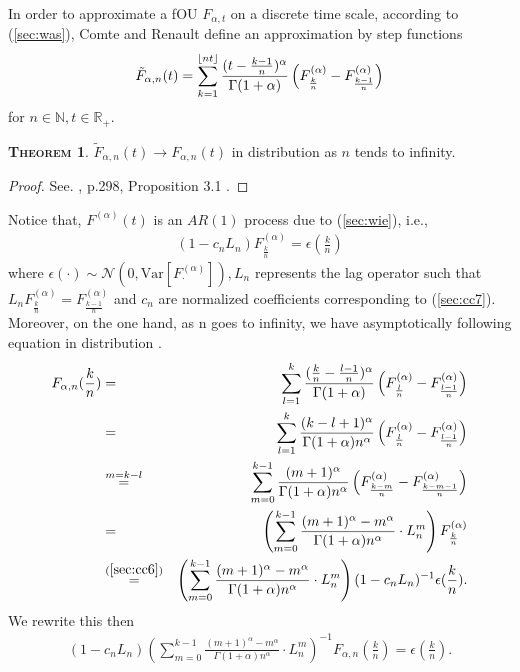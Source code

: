 \documentclass[a4paper, twoside, 11pt]{article}
\theoremstyle{definition}
\newtheorem{theorem}[definition]{\scshape Theorem}
\DeclarePairedDelimiter\floor{\lfloor}{\rfloor}
\newcommand{\brkt}[1]{\left({#1} \right)}
\begin{document}
In order to approximate a fOU $ F_{\alpha,t}$ on a discrete time scale, according to (\ref{sec:was}), Comte and Renault define an approximation by step functions
\begin{eqnarray}
 \tilde{F}_{\alpha,n}(t) = \sum_{k=1}^{\floor{nt}} \frac{(t - \frac{k-1}{n})^\alpha}{\Gamma(1+\alpha)} \brkt{F^{(\alpha)}_{\frac{k}{n}} - F^{(\alpha)}_{\frac{k-1}{n}}}
  \label{sec:cc7}
\end{eqnarray}
for $n\in \mathbb{N}, t\in\mathbb{R}_+$.
\begin{theorem}
  $\tilde{F}_{\alpha,n}(t)\rightarrow F_{\alpha,n}(t)$ in distribution as $n$ tends to infinity.  
  \label{sec:cont}
\end{theorem}
\begin{proof}
  See. \cite{comren}, p.298, Proposition 3.1 .
\end{proof}
Notice that, $F^{(\alpha)}(t)$ is an $AR(1)$ process due to (\ref{sec:wie}), i.e.,
\begin{eqnarray}
  (1-c_nL_n) {F}^{(\alpha)}_{\frac{k}{n}} = \epsilon(\frac{k}{n})
  \label{sec:cc6}
\end{eqnarray}
where $\epsilon(\cdot) \sim \mathcal{N}(0, \mathrm{Var}[F^{(\alpha)}_{\cdot}]), L_n $ represents the lag operator such that $L_n F^{(\alpha)}_{\frac{k}{n}} = F^{(\alpha)}_{\frac{k-1}{n}}$  and $c_n$ are normalized coefficients corresponding to (\ref{sec:cc7}). Moreover, on the one hand, as n goes to infinity, we have asymptotically following equation in distribution .
\begin{eqnarray}
  F_{\alpha,n}(\frac{k}{n}) &=& \sum_{l=1}^{k} \frac{(\frac{k}{n} - \frac{l-1}{n})^\alpha}{\Gamma(1+\alpha)} \brkt{F^{(\alpha)}_{\frac{l}{n}} - F^{(\alpha)}_{\frac{l-1}{n}}}\nonumber\\
  &=& \sum_{l=1}^{k} \frac{(k - l + 1)^\alpha}{\Gamma(1+\alpha)n^\alpha} \brkt{F^{(\alpha)}_{\frac{l}{n}} - F^{(\alpha)}_{\frac{l-1}{n}}}\nonumber\\
  &\overset{m=k-l}{=}& \sum_{m=0}^{k-1} \frac{(m + 1)^\alpha}{\Gamma(1+\alpha)n^\alpha} \brkt{F^{(\alpha)}_{\frac{k-m}{n}} - F^{(\alpha)}_{\frac{k-m-1}{n}}}\nonumber\\ 
  &=& \brkt{\sum_{m=0}^{k-1} \frac{(m + 1)^\alpha - m^\alpha}{\Gamma(1+\alpha)n^\alpha} \cdot L_n^m} F^{(\alpha)}_{\frac{k}{n}} \nonumber\\
  &\overset{(\ref{sec:cc6})}{=}&  \brkt{\sum_{m=0}^{k-1} \frac{(m + 1)^\alpha - m^\alpha}{\Gamma(1+\alpha)n^\alpha} \cdot L_n^m} (1-c_nL_n)^{-1}\epsilon(\frac{k}{n}).
\end{eqnarray}
We rewrite this then
\begin{eqnarray*}
  (1-c_nL_n)\brkt{\sum_{m=0}^{k-1} \frac{(m + 1)^\alpha - m^\alpha}{\Gamma(1+\alpha)n^\alpha} \cdot L_n^m}^{-1}  F_{\alpha,n}(\frac{k}{n}) =\epsilon(\frac{k}{n}).
\end{eqnarray*}
\end{document}
